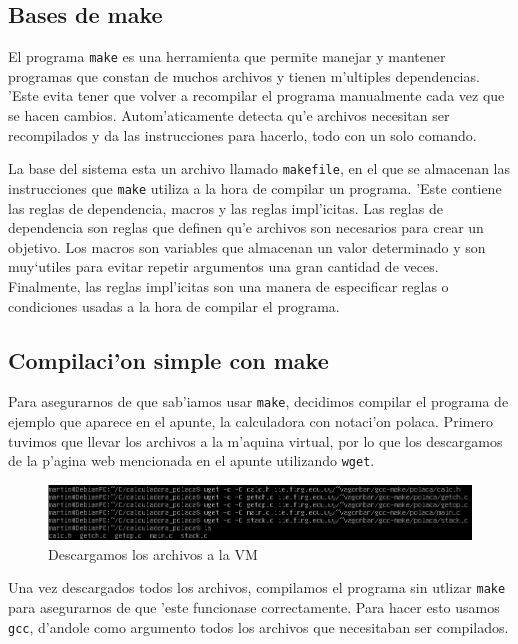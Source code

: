 \documentclass[11pt]{article}
\begin{document}
	\subsection{Bases de make}
		El programa \texttt{make} es una herramienta que permite manejar y mantener programas que constan de muchos archivos y tienen m'ultiples dependencias. 'Este evita tener que volver a recompilar el programa manualmente cada vez que se hacen cambios. Autom'aticamente detecta qu'e archivos necesitan ser recompilados y da las instrucciones para hacerlo, todo con un solo comando.
		
		La base del sistema esta un archivo llamado \texttt{makefile}, en el que se almacenan las instrucciones que \texttt{make} utiliza a la hora de compilar un programa. 'Este contiene las reglas de dependencia, macros y las reglas impl'icitas. Las reglas de dependencia son reglas que definen qu'e archivos son necesarios para crear un objetivo\footnotemark. Los macros son variables que almacenan un valor determinado y son muy`utiles para evitar repetir argumentos una gran cantidad de veces. Finalmente, las reglas impl'icitas son una manera de especificar reglas o condiciones usadas a la hora de compilar el programa.
		

	\subsection{Compilaci'on simple con make}
		Para asegurarnos de que sab'iamos usar \texttt{make}, decidimos compilar el programa de ejemplo que aparece en el apunte, la calculadora con notaci'on polaca. Primero tuvimos que llevar los archivos a la m'aquina virtual, por lo que los descargamos de la p'agina web mencionada en el apunte utilizando \texttt{wget}.
		
		\begin{figure}[H]
				\centering
				\includegraphics[width=.9\linewidth]{Images/Seccion 2/S2.PNG}
				\caption{Descargamos los archivos a la VM}
				\label{fig:makefile-download}
		\end{figure}
		
		Una vez descargados todos los archivos, compilamos el programa sin utlizar \texttt{make} para asegurarnos de que 'este funcionase correctamente. Para hacer esto usamos \texttt{gcc}, d'andole como argumento todos los archivos que necesitaban ser compilados.
		
\end{document}
